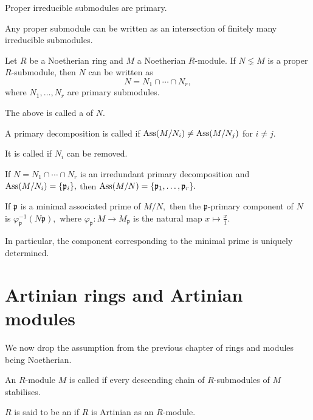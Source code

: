 \documentclass[12pt]{article}	%
\begin{document}
\begin{thm}
	Proper irreducible submodules are primary.
\end{thm}
\begin{thm}
	Any proper submodule can be written as an intersection of finitely many irreducible submodules.
\end{thm}

\begin{cor}
	Let $R$ be a Noetherian ring and $M$ a Noetherian $R$-module. If $N \lneq M$ is a proper $R$-submodule, then $N$ can be written as
	\begin{equation*} 
		N = N_1 \cap \cdots \cap N_r,
	\end{equation*}
	where $N_1, \ldots, N_r$ are primary submodules. 

	The above is called a  of $N.$
\end{cor}

\begin{defn}
	A primary decomposition is called  if $\operatorname{Ass}(M/N_i) \neq \operatorname{Ass}(M/N_j)$ for $i \neq j.$

	It is called  if $N_i$ can be removed.
\end{defn}

\begin{thm}
	If $N = N_1 \cap \cdots \cap N_r$ is an irredundant primary decomposition and $\operatorname{Ass}(M/N_i) = \{\mathfrak{p}_i\},$ then $\operatorname{Ass}(M/N) = \{\mathfrak{p}_1, \ldots, \mathfrak{p}_r\}.$ 
\end{thm}

\begin{thm}
	If $\mathfrak{p}$ is a minimal associated prime of $M/N,$ then the $\mathfrak{p}$-primary component of $N$ is $\varphi_{\mathfrak{p}}^{-1}(N\mathfrak{p}),$ where $\varphi_{\mathfrak{p}} : M \to M_\mathfrak{p}$ is the natural map $x \mapsto \frac{x}{1}.$

	In particular, the component corresponding to the minimal prime is uniquely determined.
\end{thm}

\section{Artinian rings and Artinian modules}

We now drop the assumption from the previous chapter of rings and modules being Noetherian.

\begin{defn}%
	An $R$-module $M$ is called  if every descending chain of $R$-submodules of $M$ stabilises.

	$R$ is said to be an  if $R$ is Artinian as an $R$-module.
\end{defn}
\end{document}
